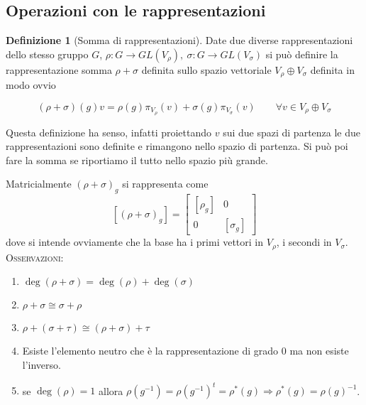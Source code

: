 \documentclass[11pt]{article}
\theoremstyle{plain}
\theoremstyle{definition}
\newtheorem{defn}{Definizione}[section]
\theoremstyle{remark}
\begin{document}
\newpage
\subsection{Operazioni con le rappresentazioni}

\begin{defn}[Somma di rappresentazioni]
  Date due diverse rappresentazioni dello stesso gruppo $G$, $\rho: G \to GL(V_\rho), \ \sigma: G \to GL(V_\sigma)$ si può definire la rappresentazione somma $\rho + \sigma$ definita sullo spazio vettoriale $V_\rho \oplus V_\sigma$ definita in modo ovvio

  \[ (\rho + \sigma)(g) v = \rho(g) \pi_{V_\rho}(v) + \sigma(g) \pi_{V_\sigma}(v) \qquad \forall v \in V_\rho \oplus V_\sigma \]

  Questa definizione ha senso, infatti proiettando $v$ sui due spazi di partenza le due rappresentazioni sono definite e rimangono nello spazio di partenza. Si può poi fare la somma se riportiamo il tutto nello spazio più grande.
\label{defn:somma di rappresentazioni}
\end{defn}
Matricialmente $(\rho+\sigma)_g$ si rappresenta come
\[ [(\rho+\sigma)_g]= \begin{bmatrix}
[\rho_g] & 0\\ 
0 & [\sigma_g]
\end{bmatrix} \]
dove si intende ovviamente che la base ha i primi vettori in $V_{\rho}$, i secondi in $V_{\sigma}$.\\
\textsc{Osservazioni:}

\begin{enumerate}
\item $\deg(\rho+\sigma)=\deg(\rho)+\deg(\sigma)$
\item $\rho + \sigma \cong \sigma + \rho$
\item $\rho + (\sigma + \tau) \cong (\rho + \sigma ) + \tau$
\item Esiste l'elemento neutro che è la rappresentazione di grado 0 ma non esiste l'inverso.
\item se $\deg(\rho)=1$ allora $\rho(g^{-1})=\rho(g^{-1})^t=\rho^*(g)\Rightarrow \rho^*(g)=\rho(g)^{-1}$.

\end{enumerate}
\end{document}

